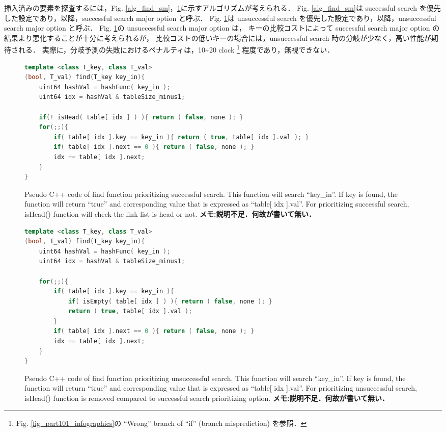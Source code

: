 挿入済みの要素を探査するには，Fig. \ref{alg_find_sm}，\ref{alg_find_usm}に示すアルゴリズムが考えられる．
Fig. \ref{alg_find_sm}は successful search を優先した設定であり，以降，successful search major option と呼ぶ．
Fig. \ref{alg_find_usm}は unsuccessful search を優先した設定であり，以降，unsuccessful search major option と呼ぶ．
\samepage\newline\indent
Fig. \ref{alg_find_usm}の unsuccessful search major option は，
キーの比較コストによって successful search major option の結果より悪化することが十分に考えられるが，
比較コストの低いキーの場合には，unsuccessful search 時の分岐が少なく，高い性能が期待される．
実際に，分岐予測の失敗におけるペナルティは，10\textasciitilde 20 clock \footnote
{
  Fig. \ref{fig_part101_infographics}の ``Wrong'' branch of ``if'' (branch misprediction) を参照．
}
程度であり，無視できない．

\begin{figure}%
\begin{lstlisting}[language=C++]
template <class T_key, class T_val>
(bool, T_val) find(T_key key_in){
	uint64 hashVal = hashFunc( key_in );
	uint64 idx = hashVal & tableSize_minus1;
	
	if(! isHead( table[ idx ] ) ){ return ( false, none ); }
	for(;;){
		if( table[ idx ].key == key_in ){ return ( true, table[ idx ].val ); }
		if( table[ idx ].next == 0 ){ return ( false, none ); }
		idx += table[ idx ].next;
	}
}
\end{lstlisting}
\caption{
  Pseudo C++ code of find function prioritizing successful search.
  This function will search ``key\_in''.
  If key is found, the function will return ``true'' and corresponding value that is expressed as ``table[ idx ].val''.
  For prioritizing successful search, isHead() function will check the link list is head or not.
  {\bf \color{red}メモ:説明不足．何故が書いて無い．}
}
\label{alg_find_sm}
\begin{lstlisting}[language=C++]
template <class T_key, class T_val>
(bool, T_val) find(T_key key_in){
	uint64 hashVal = hashFunc( key_in );
	uint64 idx = hashVal & tableSize_minus1;
	
	for(;;){
		if( table[ idx ].key == key_in ){
			if( isEmpty( table[ idx ] ) ){ return ( false, none ); }
			return ( true, table[ idx ].val );
		}
		if( table[ idx ].next == 0 ){ return ( false, none ); }
		idx += table[ idx ].next;
	}
}
\end{lstlisting}
\caption{
  Pseudo C++ code of find function prioritizing unsuccessful search.
  This function will search ``key\_in''.
  If key is found, the function will return ``true'' and corresponding value that is expressed as ``table[ idx ].val''.
  For prioritizing unsuccessful search, isHead() function is removed compared to successful search prioritizing option.
  {\bf \color{red}メモ:説明不足．何故が書いて無い．}
}
\label{alg_find_usm}
\end{figure}

